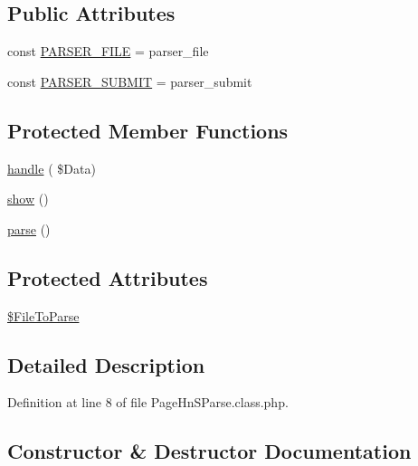 \subsection*{Public Attributes}
\begin{DoxyCompactItemize}
\item 
const \hyperlink{class_page_hn_s_parse_a50982fe35a1ecce7bc67e5cfea82953f}{P\+A\+R\+S\+E\+R\+\_\+\+F\+I\+LE} = \textquotesingle{}parser\+\_\+file\textquotesingle{}
\item 
const \hyperlink{class_page_hn_s_parse_a6e3ba750afd46ce3745277a9b4617cb3}{P\+A\+R\+S\+E\+R\+\_\+\+S\+U\+B\+M\+IT} = \textquotesingle{}parser\+\_\+submit\textquotesingle{}
\end{DoxyCompactItemize}
\subsection*{Protected Member Functions}
\begin{DoxyCompactItemize}
\item 
\hyperlink{class_page_hn_s_parse_a4237724d654a67c55fa822c06b6ab7e4}{handle} ( \$Data)
\item 
\hyperlink{class_page_hn_s_parse_a26a8990f74656c2f519905ee7005683a}{show} ()
\item 
\hyperlink{class_page_hn_s_parse_ac1c8575cca2948593c34fe434340e62c}{parse} ()
\end{DoxyCompactItemize}
\subsection*{Protected Attributes}
\begin{DoxyCompactItemize}
\item 
\hyperlink{class_page_hn_s_parse_ae2dc2e8584a66cdd970add1bf5d46852}{\$\+File\+To\+Parse}
\end{DoxyCompactItemize}


\subsection{Detailed Description}


Definition at line 8 of file Page\+Hn\+S\+Parse.\+class.\+php.



\subsection{Constructor \& Destructor Documentation}
\mbox{\label{class_page_hn_s_parse_a6cde58c60a6b752d06d900d52527ae8b}} 
